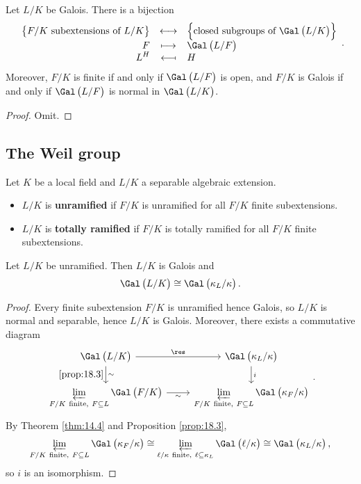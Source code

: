 \begin{theorem}
\label{thm:18.4}
Let $ L / K $ be Galois. There is a bijection
$$ \bijection{\cbr{F / K \ \text{subextensions of} \ L / K}}{\cbr{\text{closed subgroups of} \ \Gal\br{L / K}}}{F}{\Gal\br{L / F}}{L^H}{H}. $$
Moreover, $ F / K $ is finite if and only if $ \Gal\br{L / F} $ is open, and $ F / K $ is Galois if and only if $ \Gal\br{L / F} $ is normal in $ \Gal\br{L / K} $.
\end{theorem}

\begin{proof}
Omit.
\end{proof}

\subsection{The Weil group}

Let $ K $ be a local field and $ L / K $ a separable algebraic extension.

\begin{definition}
\hfill
\begin{itemize}
\item $ L / K $ is \textbf{unramified} if $ F / K $ is unramified for all $ F / K $ finite subextensions.
\item $ L / K $ is \textbf{totally ramified} if $ F / K $ is totally ramified for all $ F / K $ finite subextensions.
\end{itemize}
\end{definition}

\begin{proposition}
Let $ L / K $ be unramified. Then $ L / K $ is Galois and
$$ \Gal\br{L / K} \cong \Gal\br{\kappa_L / \kappa}. $$
\end{proposition}

\begin{proof}
Every finite subextension $ F / K $ is unramified hence Galois, so $ L / K $ is normal and separable, hence $ L / K $ is Galois. Moreover, there exists a commutative diagram
$$
\begin{tikzcd}
\Gal\br{L / K} \arrow{r}{\res} \arrow{d}{\sim}[swap]{\ref{prop:18.3}} & \Gal\br{\kappa_L / \kappa} \arrow{d}{i} \\
\displaystyle\varprojlim_{F / K \ \text{finite}, \ F \subseteq L} \Gal\br{F / K} \arrow{r}[swap]{\sim} & \displaystyle\varprojlim_{F / K \ \text{finite}, \ F \subseteq L} \Gal\br{\kappa_F / \kappa}
\end{tikzcd}.
$$
By Theorem \ref{thm:14.4} and Proposition \ref{prop:18.3},
$$ \varprojlim_{F / K \ \text{finite}, \ F \subseteq L} \Gal\br{\kappa_F / \kappa} \cong \varprojlim_{\ell / \kappa \ \text{finite}, \ \ell \subseteq \kappa_L} \Gal\br{\ell / \kappa} \cong \Gal\br{\kappa_L / \kappa}, $$
so $ i $ is an isomorphism.
\end{proof}

